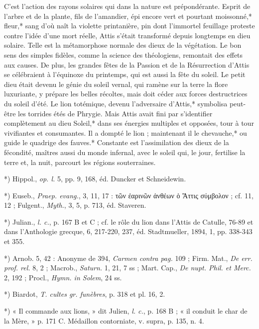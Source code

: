 \documentclass[a4paper, 11pt, oneside, polutonikogreek, french]{article}
\begin{document}
C'est l'action des rayons solaires qui dans la nature est prépondérante. Esprit de l'arbre et de la plante, fils de l'amandier, épi encore vert et pourtant moissonné,* fleur,* sang d'où naît la violette printanière, pin dont l'immortel feuillage proteste contre l'idée d'une mort réelle, Attis s'était transformé depuis longtemps en dieu solaire. Telle est la métamorphose normale des dieux de la végétation. Le bon sens des simples fidèles, comme la science des théologiens, remontait des effets aux causes. De plus, les grandes fêtes de la Passion et de la Résurrection d'Attis se célébraient à l'équinoxe du printemps, qui est aussi la fête du soleil. Le petit dieu était devenu le génie du soleil vernal, qui ramène sur la terre la flore luxuriante, y prépare les belles récoltes, mais doit céder aux forces destructrices du soleil d'été. Le lion totémique, devenu l'adversaire d'Attis,* symbolisa peut-être les torrides étés de Phrygie. Mais Attis avait fini par s'identifier complètement au dieu Soleil,* dans ses énergies multiples et opposées, tour à tour vivifiantes et consumantes. Il a dompté le lion ; maintenant il le chevauche,* ou guide le quadrige des fauves.* Constante est l'assimilation des dieux de la fécondité, maîtres aussi du monde infernal, avec le soleil qui, le jour, fertilise la terre et, la nuit, parcourt les régions souterraines.

*) Hippol., \emph{op. l.} 5, pp. 9, 168, éd. Duncker et Schneidewin.

*) Euseb., \emph{Praep. evang.}, 3, 11, 17 : τῶν ἐαρινῶν ἀνθέων ὁ Ἄττις σύμβολον ; cf. 11, 12 ; Fulgent., \emph{Myth.}, 3, 5, p. 713, éd. Staveren.

*) Julian., \emph{l. c.}, p. 167 B et C ; cf. le rôle du lion dans l'Attis de Catulle, 76-89 et dans l'Anthologie grecque, 6, 217-220, 237, éd. Stadtmueller, 1894, 1, pp. 338-343 et 355.

*) Arnob. 5, 42 : Anonyme de 394, \emph{Carmen contra pag.} 109 ; Firm. Mat., \emph{De err. prof. rel.} 8, 2 ; Macrob., \emph{Saturn.} 1, 21, 7 ss ; Mart. Cap., \emph{De nupt. Phil. et Merc.} 2, 192 ; Procl., \emph{Hymn. in Solem}, 24 ss.

*) Biardot, \emph{T. cultes gr. funèbres}, p. 318 et pl. 16, 2.

*) « Il commande aux lions, » dit Julien, \emph{l. c.}, p. 168 B ; « il conduit le char de la Mère, » p. 171 C. Médaillon contorniate, v. supra, p. 135, n. 4.
\end{document}
